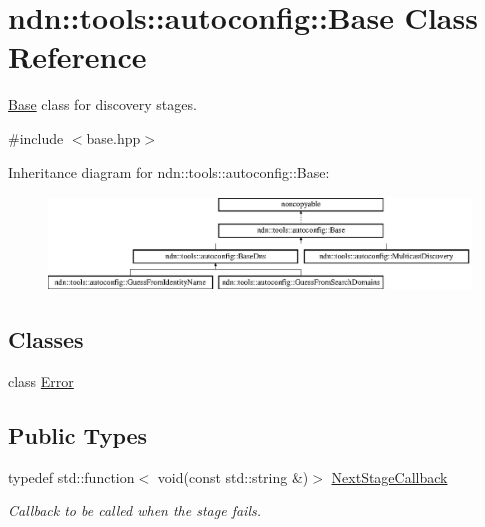 \hypertarget{classndn_1_1tools_1_1autoconfig_1_1Base}{}\section{ndn\+:\+:tools\+:\+:autoconfig\+:\+:Base Class Reference}
\label{classndn_1_1tools_1_1autoconfig_1_1Base}


\hyperlink{classndn_1_1tools_1_1autoconfig_1_1Base}{Base} class for discovery stages.  




{\ttfamily \#include $<$base.\+hpp$>$}

Inheritance diagram for ndn\+:\+:tools\+:\+:autoconfig\+:\+:Base\+:\begin{figure}[H]
\begin{center}
\leavevmode
\includegraphics[height=2.514029cm]{classndn_1_1tools_1_1autoconfig_1_1Base}
\end{center}
\end{figure}
\subsection*{Classes}
\begin{DoxyCompactItemize}
\item 
class \hyperlink{classndn_1_1tools_1_1autoconfig_1_1Base_1_1Error}{Error}
\end{DoxyCompactItemize}
\subsection*{Public Types}
\begin{DoxyCompactItemize}
\item 
typedef std\+::function$<$ void(const std\+::string \&)$>$ \hyperlink{classndn_1_1tools_1_1autoconfig_1_1Base_a1b9466e64370f1ead34b754096562445}{Next\+Stage\+Callback}\hypertarget{classndn_1_1tools_1_1autoconfig_1_1Base_a1b9466e64370f1ead34b754096562445}{}\label{classndn_1_1tools_1_1autoconfig_1_1Base_a1b9466e64370f1ead34b754096562445}

\begin{DoxyCompactList}\small\item\em Callback to be called when the stage fails. \end{DoxyCompactList}\end{DoxyCompactItemize}
